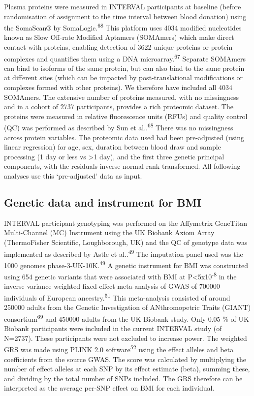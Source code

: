\documentclass[11pt,twoside]{bristolthesis}
\begin{document}
Plasma proteins were measured in INTERVAL participants at baseline (before randomisation of assignment to the time interval between blood donation) using the SomaScan® by SomaLogic.\textsuperscript{68} This platform uses 4034 modified nucleotides known as Slow Off-rate Modified Aptamers (SOMAmers) which make direct contact with proteins, enabling detection of 3622 unique proteins or protein complexes and quantifies them using a DNA microarray.\textsuperscript{67} Separate SOMAmers can bind to isoforms of the same protein, but can also bind to the same protein at different sites (which can be impacted by post-translational modifications or complexes formed with other proteins). We therefore have included all 4034 SOMAmers. The extensive number of proteins measured, with no missingness and in a cohort of 2737 participants, provides a rich proteomic dataset. The proteins were measured in relative fluorescence units (RFUs) and quality control (QC) was performed as described by Sun et al..\textsuperscript{68} There was no missingness across protein variables. The proteomic data used had been pre-adjusted (using linear regression) for age, sex, duration between blood draw and sample processing (1 day or less vs \textgreater1 day), and the first three genetic principal components, with the residuals inverse normal rank transformed. All following analyses use this `pre-adjusted' data as input.

\hypertarget{genetic-data-and-instrument-for-bmi}{%
\subsection{Genetic data and instrument for BMI}\label{genetic-data-and-instrument-for-bmi}}

INTERVAL participant genotyping was performed on the Affymetrix GeneTitan Multi-Channel (MC) Instrument using the UK Biobank Axiom Array (ThermoFisher Scientific, Loughborough, UK) and the QC of genotype data was implemented as described by Astle et al..\textsuperscript{49} The imputation panel used was the 1000 genomes phase-3-UK-10K.\textsuperscript{49} A genetic instrument for BMI was constructed using 654 genetic variants that were associated with BMI at P\textless5x10\textsuperscript{-8} in the inverse variance weighted fixed-effect meta-analysis of GWAS of 700000 individuals of European ancestry.\textsuperscript{51} This meta-analysis consisted of around 250000 adults from the Genetic Investigation of ANthromopetric Traits (GIANT) consortium\textsuperscript{69} and 450000 adults from the UK Biobank study. Only 0.05 \% of UK Biobank participants were included in the current INTERVAL study (of N=2737). These participants were not excluded to increase power. The weighted GRS was made using PLINK 2.0 software\textsuperscript{52} using the effect alleles and beta coefficients from the source GWAS. The score was calculated by multiplying the number of effect alleles at each SNP by its effect estimate (beta), summing these, and dividing by the total number of SNPs included. The GRS therefore can be interpreted as the average per-SNP effect on BMI for each individual.
\end{document}
